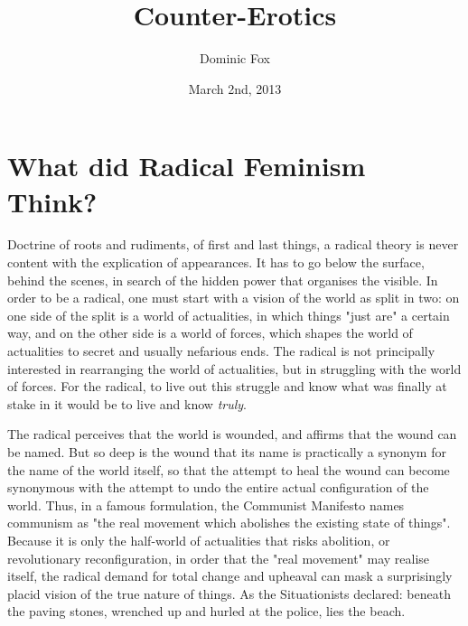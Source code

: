 \documentclass[a5paper]{memoir}
\title{Counter-Erotics}
\author{Dominic Fox}
\date{March 2nd, 2013}
\begin{document}
\maketitle

\chapter{What did Radical Feminism Think?}

Doctrine of roots and rudiments, of first and last things, a radical theory is never content with the explication of appearances. It has to go below the surface, behind the scenes, in search of the hidden power that organises the visible. In order to be a radical, one must start with a vision of the world as split in two: on one side of the split is a world of actualities, in which things "just are" a certain way, and on the other side is a world of forces, which shapes the world of actualities to secret and usually nefarious ends. The radical is not principally interested in rearranging the world of actualities, but in struggling with the world of forces. For the radical, to live out this struggle and know what was finally at stake in it would be to live and know \emph{truly}.

The radical perceives that the world is wounded, and affirms that the wound can be named. But so deep is the wound that its name is practically a synonym for the name of the world itself, so that the attempt to heal the wound can become synonymous with the attempt to undo the entire actual configuration of the world. Thus, in a famous formulation, the Communist Manifesto names communism as "the real movement which abolishes the existing state of things". Because it is only the half-world of actualities that risks abolition, or revolutionary reconfiguration, in order that the "real movement" may realise itself, the radical demand for total change and upheaval can mask a surprisingly placid vision of the true nature of things. As the Situationists declared: beneath the paving stones, wrenched up and hurled at the police, lies the beach.
\end{document}
